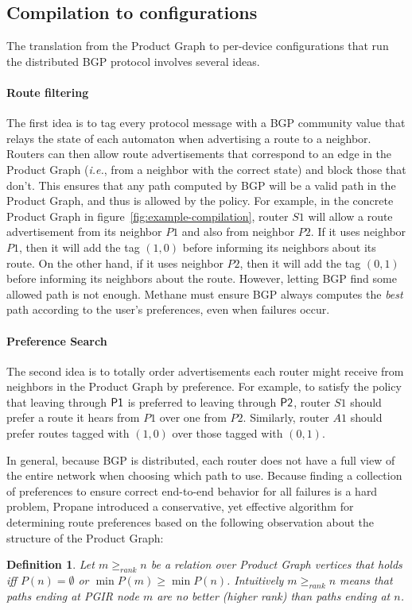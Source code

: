 \documentclass{sig-alternate-10pt}
\newcommand{\IE}{\emph{i.e.}}
\newcommand{\sysname}{{\small \sf Methane}\xspace}
\newcommand{\para}[1]{\paragraph*{\textbf{#1}}}
\newtheorem{defn}{Definition}
\begin{document}
\subsection{Compilation to configurations}

The translation from the Product Graph to per-device configurations that run the distributed BGP protocol involves several ideas.

\para{Route filtering}

The first idea is to tag every protocol message with a BGP community value that relays the state of each automaton when advertising a route to a neighbor. Routers can then allow route advertisements that correspond to an edge in the Product Graph (\IE, from a neighbor with the correct state) and block those that don't. This ensures that any path computed by BGP will be a valid path in the Product Graph, and thus is allowed by the policy. For example, in the concrete Product Graph in figure~\ref{fig:example-compilation}, router $S1$ will allow a route advertisement from its neighbor $P1$ and also from neighbor $P2$. If it uses neighbor $P1$, then it will add the tag $(1,0)$ before informing its neighbors about its route. On the other hand, if it uses neighbor $P2$, then it will add the tag $(0,1)$ before informing its neighbors about the route.
%
However, letting BGP find some allowed path is not enough. \sysname must ensure BGP always computes the \emph{best} path according to the user's preferences, even when failures occur.


\para{Preference Search}
The second idea is to totally order advertisements each router might receive from neighbors in the Product Graph by preference. For example, to satisfy the policy that leaving through $\sf{P1}$ is preferred to leaving through $\sf{P2}$, router $S1$ should prefer a route it hears from $P1$ over one from $P2$. Similarly, router $A1$ should prefer routes tagged with $(1,0)$ over those tagged with $(0,1)$.

In general, because BGP is distributed, each router does not have a full view of the entire network when choosing which path to use. Because finding a collection of preferences to ensure correct end-to-end behavior for all failures is a hard problem, Propane introduced a conservative, yet effective algorithm for determining route preferences based on the following observation about the structure of the Product Graph:

\begin{defn}
Let $m \geq_{rank} n$ be a relation over Product Graph vertices that holds iff $P(n) = \emptyset$ or $\min P(m) \geq \min P(n)$. Intuitively $m \geq_{rank} n$ means that paths ending at PGIR node $m$ are no better (higher rank) than paths ending at $n$.
%
\end{defn}
\noindent
%
\end{document}
